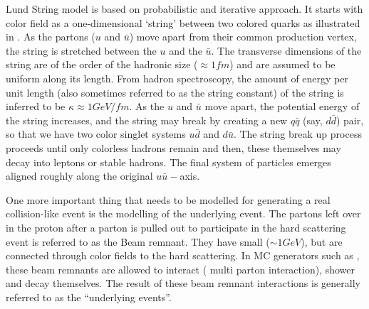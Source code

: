 Lund String model is based on probabilistic and iterative approach. It starts with color field as a one-dimensional `string' between two colored 
quarks as illustrated in \fig{\ref{fig:LundModel}}. As the partons ($u$ and $\bar{u}$) move apart from their common production vertex, the string
 is stretched between the $u$ and the $\bar{u}$. The transverse dimensions of the string are of the order of the hadronic size ($\approx 1\unit{fm}$)
and are assumed to be uniform along its length. From hadron spectroscopy, the amount of energy per unit length (also sometimes referred to as 
the string constant) of the string is inferred to be $\kappa\approx1\unit{GeV/fm}$. As the $u$ and $\bar{u}$ move apart, the potential energy of 
the string increases, and the string may break by creating a new $q\bar{q}$ (say, $d\bar{d}$) pair, so that we have two color singlet systems 
$u\bar{d}$ and $d\bar{u}$. The string break up process proceeds until only colorless hadrons remain and then, these themselves may decay into 
leptons or stable hadrons. The final system of particles emerges aligned roughly along the original $u\bar{u}-$axis.

One more important thing that needs to be modelled for generating a real collision-like event is the modelling of the underlying event. 
The partons left over in the proton after a parton is pulled out to participate in the hard scattering event is referred to as the Beam
remnant. They have small \pt  ($\sim1\unit{GeV}$), but are connected through color fields to the hard scattering. In MC generators such as
\pythia, these beam remnants are allowed to interact ( multi parton interaction), shower and decay themselves. The result of these beam 
remnant interactions is generally referred to as the ``underlying events''.


